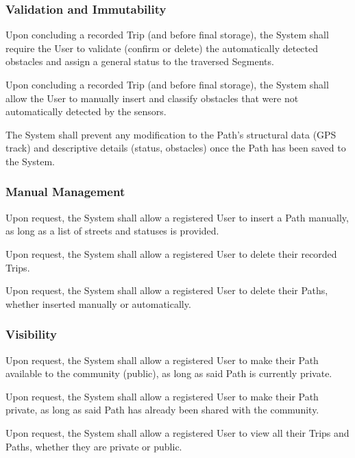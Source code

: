 \subsubsection*{Validation and Immutability}
\begin{rlist}[resume]
    \item Upon concluding a recorded Trip (and before final storage), the System shall require the User to validate (confirm or delete) the automatically detected obstacles and assign a general status to the traversed Segments.
    \item Upon concluding a recorded Trip (and before final storage), the System shall allow the User to manually insert and classify obstacles that were not automatically detected by the sensors.
    \item The System shall prevent any modification to the Path's structural data (GPS track) and descriptive details (status, obstacles) once the Path has been saved to the System.
\end{rlist}

\subsubsection*{Manual Management}
\begin{rlist}[resume]
    \item Upon request, the System shall allow a registered User to insert a Path manually, as long as a list of streets and statuses is provided.
    \item Upon request, the System shall allow a registered User to delete their recorded Trips.
    \item Upon request, the System shall allow a registered User to delete their Paths, whether inserted manually or automatically.
\end{rlist}

\subsubsection*{Visibility}
\begin{rlist}[resume]
    \item Upon request, the System shall allow a registered User to make their Path available to the community (public), as long as said Path is currently private.
    \item Upon request, the System shall allow a registered User to make their Path private, as long as said Path has already been shared with the community.
    \item Upon request, the System shall allow a registered User to view all their Trips and Paths, whether they are private or public.
\end{rlist}

